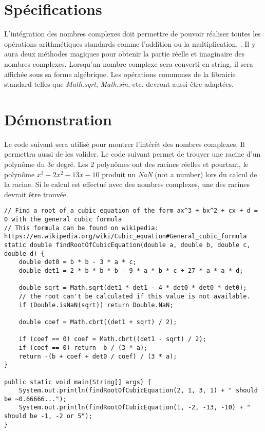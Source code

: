 \section{Spécifications}

L'intégration des nombres complexes doit permettre de pouvoir réaliser toutes les opérations arithmétiques standards comme l'addition ou la multiplication. . Il y aura deux méthodes magiques pour obtenir la partie réelle et imaginaire des nombres complexes. Lorsqu'un nombre complexe sera converti en string, il sera affichée sous sa forme algébrique. Les opérations communes de la librairie standard telles que \textit{Math.sqrt}, \textit{Math.sin}, etc. devront aussi être adaptées.

\section{Démonstration}

Le code suivant sera utilisé pour montrer l'intérêt des nombres complexes. Il permettra aussi de les valider. Le code suivant permet de trouver une racine d'un polynôme du 3e degré. Les 2 polynômes ont des racines réelles et pourtant, le polynôme $x^3 - 2x^2 - 13x - 10$ produit un \textit{NaN} (not a number) lors du calcul de la racine. Si le calcul est effectué avec des nombres complexes, une des racines devrait être trouvée.
\begin{verbatim}
// Find a root of a cubic equation of the form ax^3 + bx^2 + cx + d = 0 with the general cubic formula
// This formula can be found on wikipedia: https://en.wikipedia.org/wiki/Cubic_equation#General_cubic_formula
static double findRootOfCubicEquation(double a, double b, double c, double d) {
    double det0 = b * b - 3 * a * c;
    double det1 = 2 * b * b * b - 9 * a * b * c + 27 * a * a * d;

    double sqrt = Math.sqrt(det1 * det1 - 4 * det0 * det0 * det0);
    // the root can't be calculated if this value is not available.
    if (Double.isNaN(sqrt)) return Double.NaN;

    double coef = Math.cbrt((det1 + sqrt) / 2);

    if (coef == 0) coef = Math.cbrt((det1 - sqrt) / 2);
    if (coef == 0) return -b / (3 * a);
    return -(b + coef + det0 / coef) / (3 * a);
}

public static void main(String[] args) {
    System.out.println(findRootOfCubicEquation(2, 1, 3, 1) + " should be ~0.66666...");
    System.out.println(findRootOfCubicEquation(1, -2, -13, -10) + " should be -1, -2 or 5");
}
\end{verbatim}
